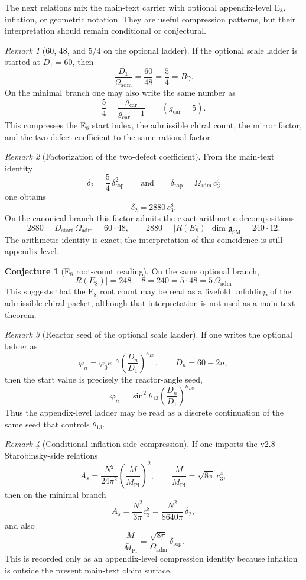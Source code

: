 \documentclass[11pt,a4paper]{article}
\theoremstyle{definition}
\newtheorem{conjecture}[theorem]{Conjecture}
\theoremstyle{remark}
\newtheorem*{remark}{Remark}
\newcommand{\Mpl}{\bar M_{\mathrm{Pl}}}
\newcommand{\cthree}{c_3}
\newcommand{\phiz}{\varphi_0}
\newcommand{\deltatop}{\delta_{\mathrm{top}}}
\newcommand{\SM}{\mathrm{SM}}
\newcommand{\Oadm}{\Omega_{\mathrm{adm}}}
\newcommand{\gcar}{g_{\mathrm{car}}}
\newcommand{\Dstart}{D_{\mathrm{start}}}
\begin{document}
The next relations mix the main-text carrier with optional appendix-level E$_8$, inflation, or geometric notation. They are useful compression patterns, but their interpretation should remain conditional or conjectural.

\begin{remark}[60, 48, and \texorpdfstring{$5/4$}{5/4} on the optional ladder]
If the optional scale ladder is started at $D_1=60$, then
\[
\frac{D_1}{\Oadm}=\frac{60}{48}=\frac54=B\gamma.
\]
On the minimal branch one may also write the same number as
\[
\frac54=\frac{\gcar}{\gcar-1}\qquad (\gcar=5).
\]
This compresses the E$_8$ start index, the admissible chiral count, the mirror factor, and the two-defect coefficient to the same rational factor.
\end{remark}

\begin{remark}[Factorization of the two-defect coefficient]
From the main-text identity
\[
\delta_2=\frac54\,\deltatop^2
\qquad\text{and}\qquad
\deltatop=\Oadm\,\cthree^4
\]
one obtains
\[
\delta_2=2880\,\cthree^8.
\]
On the canonical branch this factor admits the exact arithmetic decompositions
\[
2880=\Dstart\,\Oadm=60\cdot48,
\qquad
2880=|R(E_8)|\,\dim\mathfrak g_{\SM}=240\cdot12.
\]
The arithmetic identity is exact; the interpretation of this coincidence is still appendix-level.
\end{remark}

\begin{conjecture}[E$_8$ root-count reading]
On the same optional branch,
\[
|R(E_8)|=248-8=240=5\cdot48=5\,\Oadm.
\]
This suggests that the E$_8$ root count may be read as a fivefold unfolding of the admissible chiral packet, although that interpretation is not used as a main-text theorem.
\end{conjecture}

\begin{remark}[Reactor seed of the optional scale ladder]
If one writes the optional ladder as
\[
\varphi_n=\phiz e^{-\gamma}\left(\frac{D_n}{D_1}\right)^{\kappa_{E8}},
\qquad
D_n=60-2n,
\]
then the start value is precisely the reactor-angle seed,
\[
\varphi_n=\sin^2\theta_{13}\left(\frac{D_n}{D_1}\right)^{\kappa_{E8}}.
\]
Thus the appendix-level ladder may be read as a discrete continuation of the same seed that controls $\theta_{13}$.
\end{remark}

\begin{remark}[Conditional inflation-side compression]
If one imports the v2.8 Starobinsky-side relations
\[
A_s=\frac{N^2}{24\pi^2}\left(\frac{M}{\Mpl}\right)^2,
\qquad
\frac{M}{\Mpl}=\sqrt{8\pi}\,\cthree^4,
\]
then on the minimal branch
\[
A_s=\frac{N^2}{3\pi}\cthree^8=\frac{N^2}{8640\pi}\,\delta_2,
\]
and also
\[
\frac{M}{\Mpl}=\frac{\sqrt{8\pi}}{\Oadm}\,\deltatop.
\]
This is recorded only as an appendix-level compression identity because inflation is outside the present main-text claim surface.
\end{remark}
\end{document}

